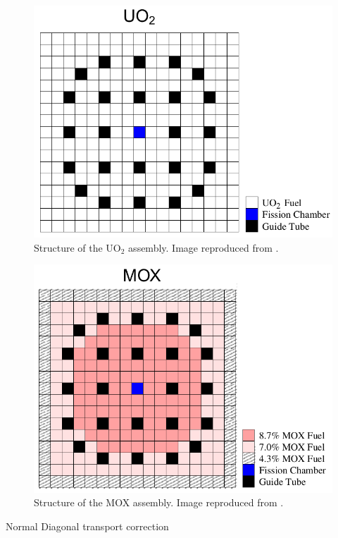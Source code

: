 \documentclass{anstrans}
\begin{document}
\begin{figure}[htbp!] %
    \centering
    \includegraphics[width=0.95\linewidth]{figures/bench-config2.png}
    \hfill
    \caption{Structure of the UO$_2$ assembly. Image reproduced from \cite{capilla_applications_2009}.}
    \label{fig:bench2}
\end{figure}

\begin{figure}[htbp!] %
    \centering
    \includegraphics[width=0.95\linewidth]{figures/bench-config3.png}
    \hfill
    \caption{Structure of the MOX assembly. Image reproduced from \cite{capilla_applications_2009}.}
    \label{fig:bench3}
\end{figure}

Normal \cite{capilla_applications_2009}
Diagonal transport correction \cite{cavarec_benchmark_1994}
\end{document}
